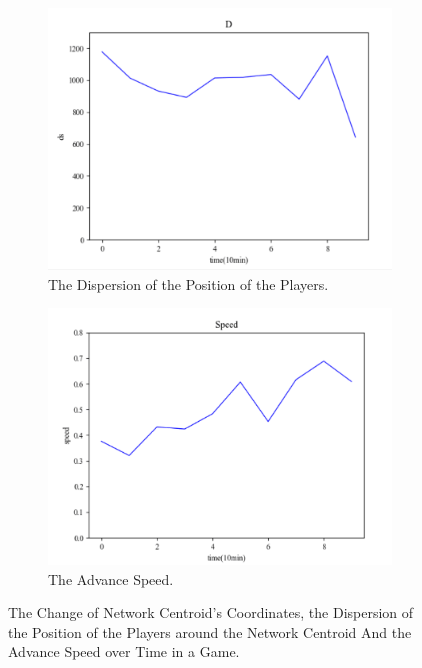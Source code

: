 \documentclass{mcmthesis}
\begin{document}
\begin{figure}[h]
\begin{subfigure}[b]{0.5\textwidth}
			\includegraphics[width=\textwidth]{figures/d1.png}
			\caption{The Dispersion of the Position of the Players.}
			\label{fig:d1}
		\end{subfigure}%
		\begin{subfigure}[b]{0.5\textwidth}
			\includegraphics[width=\textwidth]{figures/s1.png}
			\caption{The Advance Speed.}
			\label{fig:s1}
		\end{subfigure}
		\caption{The Change of Network Centroid's Coordinates, the Dispersion of the Position of the Players around the Network Centroid And the Advance Speed over Time in a Game.}\label{fig:game}
	\end{figure}
\end{document}
